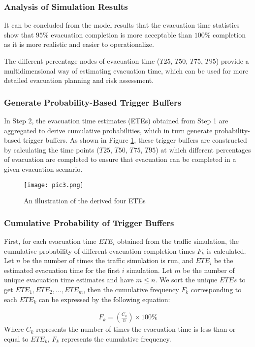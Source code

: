 \documentclass[12pt]{article}  %
\begin{document}
\subsubsection*{Analysis of Simulation Results}
It can be concluded from the model results that the evacuation time statistics show that $95\%$ evacuation completion is more acceptable than $100\%$ completion as it is more realistic and easier to operationalize.

The different percentage nodes of evacuation time ($T25$, $T50$, $T75$, $T95$) provide a multidimensional way of estimating evacuation time, which can be used for more detailed evacuation planning and risk assessment.

\subsubsection{Generate Probability-Based Trigger Buffers}
In Step 2, the evacuation time estimates (ETEs) obtained from Step 1 are aggregated to derive cumulative probabilities, which in turn generate probability-based trigger buffers. As shown in Figure \ref{pic3}, these trigger buffers are constructed by calculating the time points ($T25$, $T50$, $T75$, $T95$) at which different percentages of evacuation are completed to ensure that evacuation can be completed in a given evacuation scenario.
\begin{figure}[htbp]  
	\centering  
	\texttt{[image: pic3.png]} 
	\caption{An illustration of the derived four ETEs} 
	\label{pic3}
\end{figure}
\vspace{-0.5cm}

\subsubsection*{Cumulative Probability of Trigger Buffers}
First, for each evacuation time \(ETE_i \) obtained from the traffic simulation, the cumulative probability of different evacuation completion times \(F_k \) is calculated. Let \(n \) be the number of times the traffic simulation is run, and \(ETE_i \) be the estimated evacuation time for the first \(i\) simulation. Let \(m \) be the number of unique evacuation time estimates and have \(m \leq n \). We sort the unique \( ETEs \) to get \( ETE_1, ETE_2,\dots , ETE_m \), then the cumulative frequency \(F_k \) corresponding to each \(ETE_k \) can be expressed by the following equation:

\begin{equation}
	\begin{aligned}
		F_k = \left( \frac{C_k}{n} \right) \times 100\% 
	\end{aligned}
\end{equation}
Where \( C_k \) represents the number of times the evacuation time is less than or equal to \( ETE_k \), \(F_k \) represents the cumulative frequency.
\end{document}

